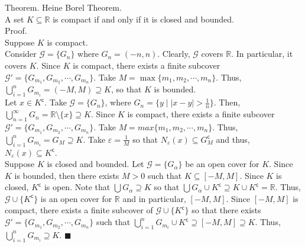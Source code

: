 \documentclass[twocolumn]{article}
\newcommand{\qed}{$\blacksquare$}
\newcommand{\COMPLEMENT}{^\mathsf{c}}
\let\complement\COMPLEMENT
\let\eps\varepsilon
\newcommand{\reals}{\mathbb{R}}
\begin{document}
Theorem. Heine Borel Theorem. \\
A set $K \subseteq \reals$ is compact if and only if it is closed and bounded. \\
Proof. \\
Suppose $K$ is compact. \\
Consider $\mathcal{G} = \{ G_n \}$ where $G_n = (-n, n)$. Clearly, $\mathcal{G}$ covers $\reals$. In particular, it covers $K$. Since $K$ is compact, there exists a finite subcover $\mathcal{G'} = \{ G_{m_1}, G_{m_2}, \cdots, G_{m_n} \}$. Take $M = \max \{ m_1, m_2, \cdots, m_n \}$. Thus, $\bigcup_{i = 1}^n G_{m_i} = (-M, M) \supseteq K$, so that $K$ is bounded. \\
Let $x \in K\complement$. Take $\mathcal{G} = \{ G_n \}$, where $G_n = \{ y \mid |x - y| > \frac{1}{n} \}$. Then, $\bigcup_{n = 1}^\infty G_n = \reals \setminus \{ x \} \supseteq K$. Since $K$ is compact, there exists a finite subcover $\mathcal{G'} = \{ G_{m_1}, G_{m_2}, \cdots, G_{m_n} \}$. Take $M = max \{ m_1, m_2, \cdots, m_n \}$. Thus, $\bigcup_{i = 1}^n G_{m_i} = G_M \supseteq K$. Take $\eps = \frac{1}{M}$ so that $N_\eps(x) \subseteq G_M\complement$ and thus, $N_\eps(x) \subseteq K\complement$. \\
Suppose $K$ is closed and bounded. Let $\mathcal{G} = \{ G_\alpha \}$ be an open cover for $K$. Since $K$ is bounded, then there exists $M > 0$ such that $K \subseteq [-M, M]$. Since $K$ is closed, $K\complement$ is open. Note that $\bigcup G_\alpha \supseteq K$ so that $\bigcup G_\alpha \cup K\complement \supseteq K \cup K\complement = \reals$. Thus, $\mathcal{G} \cup \{ K\complement \}$ is an open cover for $\reals$ and in particular, $[-M, M]$. Since $[-M, M]$ is compact, there exists a finite subcover of $\mathcal{G} \cup \{ K\complement \}$ so that there exists $\mathcal{G'} = \{ G_{m_1}, G_{m_2}, \cdots, G_{m_n} \}$ such that $\bigcup_{i = 1}^n G_{m_i} \cup K\complement \supseteq [-M, M] \supseteq K$. Thus, $\bigcup_{i = 1}^n G_{m_i} \supseteq K$. \qed \\
\end{document}

